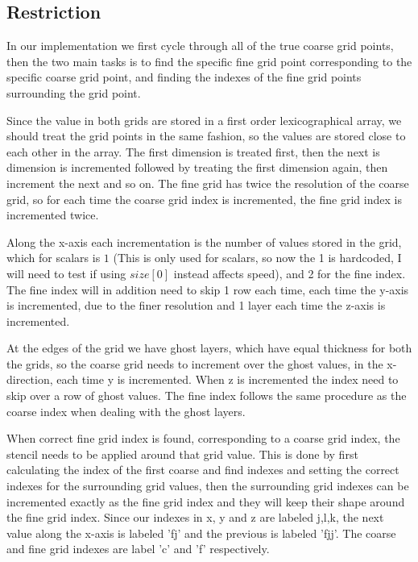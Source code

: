 


\subsection{Restriction}
	In our implementation we first cycle through all of the true coarse grid points, then
	the two main tasks is to find the specific fine grid point corresponding to the specific
 	coarse grid point, and finding the indexes of the fine grid points surrounding the grid point.

	Since the value in both grids are stored in a first order lexicographical array, we should treat the
	grid points in the same fashion, so the values are stored close to each other in the array.
	The first dimension is treated first, then the next is dimension is incremented followed by
	treating the first dimension again, then increment the next and so on. The fine grid has twice the
	resolution of the coarse grid, so for each time the coarse grid index is incremented,
	the fine grid index is incremented twice.

	Along the x-axis each incrementation is the number of values stored in the grid, which for scalars
	is \(1\) (This is only used for scalars, so now the 1 is hardcoded, I will need to test
	if using \(size[0]\) instead affects speed), and 2 for the fine index. The fine index will in addition
	need to skip 1 row each time, each time the y-axis is incremented, due to the finer resolution and 1 layer each time
	the z-axis is incremented.

	At the edges of the grid we have ghost layers, which have equal thickness for both the grids, so the
	coarse grid needs to increment over the ghost values, in the x-direction, each time y is incremented.
	When z is incremented the index need to skip over a row of ghost values. The fine index follows
	the same procedure as the coarse index when dealing with the ghost layers.

	When correct fine grid index is found, corresponding to a coarse grid index, the stencil needs to be applied around
 	that grid value. This is done by first calculating the index of the first coarse and find indexes and setting
	the correct indexes for the surrounding grid values, then the surrounding grid indexes can be incremented
	exactly as the fine grid index and they will keep their shape around the fine grid index. Since our indexes
	in x, y and z are labeled j,l,k, the next value along the x-axis is labeled 'fj' and the previous is labeled
	'fjj'. The coarse and fine grid indexes are label 'c' and 'f' respectively.


